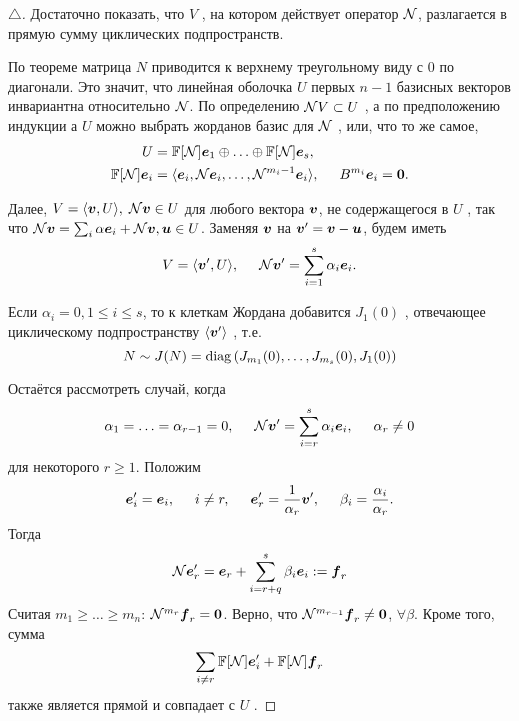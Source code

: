 \begin{proof}[$\triangle$]
    Достаточно показать, что $V$ , на котором действует оператор $\mathcal N$, разлагается в прямую сумму циклических подпространств.

    По теореме  матрица $N$ приводится к верхнему треугольному виду с 0 по диагонали. Это значит, что линейная оболочка $U$ первых $n-1$ базисных векторов инвариантна относительно $\mathcal N$. По определению $\mathcal N V \subset U$ ,  а по предположению индукции а $U$ можно выбрать жорданов базис для $\mathcal N$ , или, что то же самое,
    \begin{align*}
        U &= \mathbb{F}[\mathcal N] \mbox{\boldmath $e$}_1 \oplus \ldots \oplus \mathbb{F}[\mathcal N]\mbox{\boldmath $e$}_s, \\
        \mathbb{F} [\mathcal N] \mbox{\boldmath $e$}_i &= \langle \mbox{\boldmath $e$}_i, \mathcal N \mbox{\boldmath $e$}_i, \ldots, \mathcal N^{m_i - 1} \mbox{\boldmath $e$}_i \rangle, \hspace{0.5cm}  B^{m_i} \mbox{\boldmath $e$}_i = \mbox{\boldmath $0$}.
    \end{align*}

    Далее, $V = \langle \mbox{\boldmath $v$}, U \rangle, \; \mathcal N \mbox{\boldmath $v$} \in U$ для любого вектора $\mbox{\boldmath $v$}$, не содержащегося в $U$ , так что $\mathcal N \mbox{\boldmath $v$} = \sum_i \alpha \mbox{\boldmath $e$}_i + \mathcal N \mbox{\boldmath $v$}, \mbox{\boldmath $u$} \in U$. Заменяя $\mbox{\boldmath $v$}$ на $\mbox{\boldmath $v$}' = \mbox{\boldmath $v$} - \mbox{\boldmath $u$}$, будем иметь
    $$
        V = \langle \mbox{\boldmath $v$}', U\rangle, \hspace{0.5cm} \mathcal N \mbox{\boldmath $v$}' = \sum_{i=1}^{s} \alpha_i \mbox{\boldmath $e$}_i.
    $$

    Если $\alpha_i = 0, 1 \leq i \leq s$, то к клеткам Жордана добавится $J_1 (0)$ , отвечающее циклическому подпространству $\langle \mbox{\boldmath $v$}'\rangle$ , т.е. 
    $$
        N \sim J(N) = \mathop{\mathrm{diag}}\nolimits \left(
            J_{m_{1}} (0), \ldots, J_{m_s} (0), J_{1} (0)
        \right)
    $$

    Остаётся рассмотреть случай, когда
    $$
        \alpha_{1} = \ldots = \alpha_{r-1} = 0, \hspace{0.5cm}  \mathcal N \mbox{\boldmath $v$}' = \sum_{i=r}^s \alpha_i \mbox{\boldmath $e$}_i, \hspace{0.5cm} \alpha_r \neq 0
    $$
    для некоторого $r \geq 1$. Положим
    $$
        \mbox{\boldmath $e$}_i' = \mbox{\boldmath $e$}_i, \hspace{0.5cm}  
        i \neq r, \hspace{0.5cm}   
        \mbox{\boldmath $e$}'_r = \frac{1}{\alpha_r} \mbox{\boldmath $v$}', \hspace{0.5cm} 
        \beta_i = \frac{\alpha_i}{\alpha_r}.
    $$
    Тогда
    $$
        \mathcal N \mbox{\boldmath $e$}_r' = \mbox{\boldmath $e$}_r + \sum_{i=r+q}^s \beta_i \mbox{\boldmath $e$}_i := \mbox{\boldmath $f$}_r
    $$
    Считая $m_{1} \geq \ldots \geq m_n$: $\mathcal N^{m_r} \mbox{\boldmath $f$}_r = \mbox{\boldmath $0$}$. Верно, что $\mathcal N^{m_{r-1}} \mbox{\boldmath $f$}_r \neq \mbox{\boldmath $0$}$, $\forall \beta$. Кроме того, сумма
    $$
        \sum_{i \neq r} \mathbb{F}[\mathcal N] \mbox{\boldmath $e$}_i' + \mathbb{F}[\mathcal N] \mbox{\boldmath $f$}_r
    $$
    также является прямой и совпадает с $U$ .


\end{proof}
